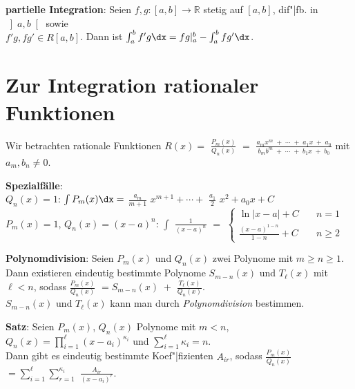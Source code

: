 \textbf{partielle Integration}:
Seien $f, g: [a,b] \rightarrow \mathbb{R}$ stetig auf $[a,b]$,
dif"|fb. in $\left]a,b\right[$ sowie \\
$f'g, fg' \in R[a,b]$. \qquad\qquad
Dann ist $\int_a^b f'g\dx = fg|_a^b - \int_a^b fg'\dx$.

\section{%
    Zur Integration rationaler Funktionen%
}

Wir betrachten rationale Funktionen
$R(x) =$ {\large $\frac{P_m(x)}{Q_n(x)}$} $ = $
{\large $\frac{a_m x^m \;+\; \cdots \;+\; a_1 x \;+\; a_0}
{b_m b^m \;+\; \cdots \;+\; b_1 x \;+\; b_0}$} mit $a_m, b_n \not= 0$.

\textbf{Spezialfälle}: \\
$Q_n(x) = 1$: \qquad $\int P_m(x)\dx = $ {\large $\frac{a_m}{m + 1}$}
$x^{m+1} + \cdots + $ {\large $\frac{a_1}{2}$} $x^2 + a_0 x + C$ \\
$P_m(x) = 1$, $Q_n(x) = (x - a)^n$: \qquad
$\int$ {\large $\frac{1}{(x - a)^n}$} $ = $
{\footnotesize $\begin{cases}\ln |x - a| + C & \quad n = 1 \\
\frac{(x - a)^{1-n}}{1 - n} + C & \quad n \ge 2 \end{cases}$}

\textbf{Polynomdivision}:
Seien $P_m(x)$ und $Q_n(x)$ zwei Polynome mit $m \ge n \ge 1$.
Dann existieren eindeutig bestimmte Polynome $S_{m-n}(x)$ und
$T_\ell(x)$ mit $\ell < n$, sodass
{\large $\frac{P_m(x)}{Q_n(x)}$}
$= S_{m-n}(x) \;+$ {\large $\frac{T_\ell(x)}{Q_n(x)}$}. \\
$S_{m-n}(x)$ und $T_\ell(x)$ kann man durch \emph{Polynomdivision} bestimmen.

\textbf{Satz}:
Seien $P_m(x)$, $Q_n(x)$ Polynome mit $m < n$,
$Q_n(x) = \prod_{i=1}^\ell (x - a_i)^{\kappa_i}$ und
$\sum_{i=1}^\ell \kappa_i = n$. \\
Dann gibt es eindeutig bestimmte Koef"|fizienten $A_{ir}$, sodass
{\large $\frac{P_m(x)}{Q_n(x)}$} $= \sum_{i=1}^\ell \sum_{r=1}^{\kappa_i}$
{\large $\frac{A_{ir}}{(x - a_i)^r}$}.

\linie

